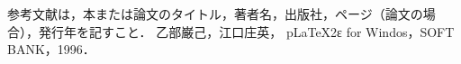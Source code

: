 

\begin{thebibliography}{3}
 参考文献は，本または論文のタイトル，著者名，出版社，ページ（論文の場合），発行年を記すこと．
乙部巌己，江口庄英，
pLaTeX2ε for Windos，SOFT BANK，1996．
\end{thebibliography}

